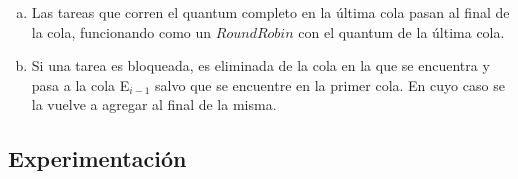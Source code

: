 \begin{enumerate}[(a)]
\item Las tareas que corren el quantum completo en la \'ultima cola pasan al final de la cola, funcionando como un $Round Robin$ con el quantum de la \'ultima cola.
	
\item Si una tarea es bloqueada, es eliminada de la cola en la que se encuentra y pasa a la cola E$_{i-1}$ salvo que se encuentre en la primer cola. En cuyo caso se la vuelve a agregar al final de la misma.

\end{enumerate}

\subsection{Experimentación}

\begin{comment}
Ahora mostraremos de donde obtuvimos la información antes mencionada

Los lotes utilizados fueron:\\

loteEj7a.tsk\\
TaskCPU 18\\
TaskCPU 18\\
TaskCPU 18\\
TaskCPU 18\\


loteEj7b.tsk\\
\#Tarea intensiva de CPU 1\\
TaskCPU 18\\
\#Tarea intensiva de CPU 2\\
@7:\\
TaskCPU 20\\
\#Tarea interactiva 1\\
TaskConsola 4 3 6\\
\#Tarea interactiva 2\\
TaskConsola 8 2 7 \\





\begin{figure}[H]
  \centering
  \caption{Se pueden apreciar (a)(b)(e)(f)}
  \label{fig:ej7a}
\end{figure}

En esta figura se puede ver claramente que es un Round Robin y que los tiempos que toman las tareas cada vez que entran en Ready son 1, 3, 2, 4, 4.. Luego de la cuarta vez que el scheduller pone a correr la tarea, siempre le da 4 tics de reloj


\begin{figure}[H]
  \centering
  \caption{Se pueden apreciar (a)(b)(d)}
  \label{fig:test2ej7}
\end{figure}


\begin{figure}[H]
  \centering
  \caption{Se pueden apreciar (a)(b)(c)(e)(f)(g)}
  \label{fig:test3ej7}
\end{figure}
\end{comment}
